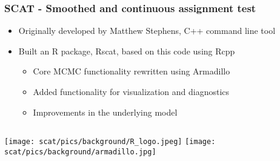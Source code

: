 \begin{frame}
\frametitle{SCAT - Smoothed and continuous assignment test }
\begin{itemize}
\item Originally developed by Matthew Stephens, C++ command line tool
\item Built an R package, Rscat, based on this code using Rcpp
\begin{itemize}
\item Core MCMC functionality rewritten using Armadillo
\item Added functionality for visualization and diagnostics
\item Improvements in the underlying model
\end{itemize}
\end{itemize}

\vspace{5mm}

\begin{columns}
\column{0.5in}
\column{0.5in}
\texttt{[image: scat/pics/background/R\_logo.jpeg]}
\column{2.25in}
\texttt{[image: scat/pics/background/armadillo.jpg]}
\end{columns}

\end{frame}